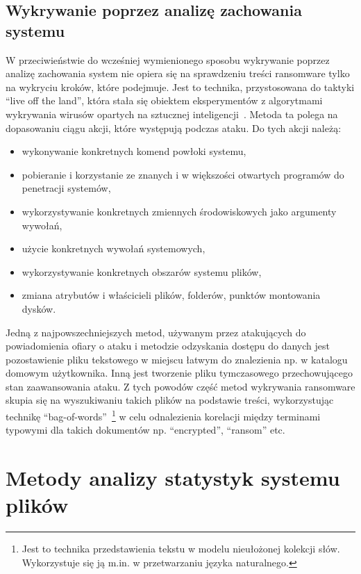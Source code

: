 \subsection{Wykrywanie poprzez analizę zachowania systemu}
W przeciwieństwie do wcześniej wymienionego sposobu wykrywanie poprzez analizę zachowania system nie opiera się na sprawdzeniu treści ransomware tylko na wykryciu kroków, które podejmuje. Jest to technika, przystosowana do taktyki \foreignquote{english}{live off the land}, która stała się obiektem eksperymentów z algorytmami wykrywania wirusów opartych na sztucznej inteligencji~\cite{vehabovic_ransomware_2022}. Metoda ta polega na dopasowaniu ciągu akcji, które występują podczas ataku. Do tych akcji należą:
\begin{itemize}
    \item wykonywanie konkretnych komend powłoki systemu,
    \item pobieranie i korzystanie ze znanych i w większości otwartych programów do penetracji systemów,
    \item wykorzystywanie konkretnych zmiennych środowiskowych jako argumenty wywołań,
    \item użycie konkretnych wywołań systemowych,
    \item wykorzystywanie konkretnych obszarów systemu plików,
    \item zmiana atrybutów i właścicieli plików, folderów, punktów montowania dysków.
\end{itemize}
Jedną z najpowszechniejszych metod, używanym przez atakujących do powiadomienia ofiary o ataku i metodzie odzyskania dostępu do danych jest pozostawienie pliku tekstowego w miejscu łatwym do znalezienia np. w katalogu domowym użytkownika. Inną jest tworzenie pliku tymczasowego przechowującego stan zaawansowania ataku. Z tych powodów część metod wykrywania ransomware skupia się na wyszukiwaniu takich plików na podstawie treści, wykorzystując technikę \foreignquote{english}{bag-of-words}~\footnote{Jest to technika przedstawienia tekstu w modelu nieułożonej kolekcji słów. Wykorzystuje się ją m.in. w przetwarzaniu języka naturalnego.} w celu odnalezienia korelacji między terminami typowymi dla takich dokumentów np. \foreignquote{english}{encrypted}, \foreignquote{english}{ransom} etc.
\section{Metody analizy statystyk systemu plików}